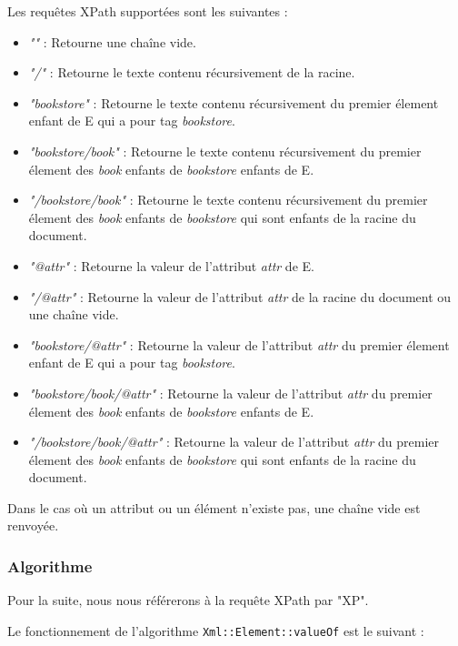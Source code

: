     Les requêtes XPath supportées sont les suivantes :
    \begin{itemize}
        \item \textit{""} : Retourne une chaîne vide.
        \item \textit{"/"} : Retourne le texte contenu récursivement de la racine.
        \item \textit{"bookstore"} : Retourne le texte contenu récursivement du premier élement enfant de E qui a pour tag \textit{bookstore}.
        \item \textit{"bookstore/book"} : Retourne le texte contenu récursivement du premier élement des \textit{book} enfants de \textit{bookstore} enfants de E.
        \item \textit{"/bookstore/book"} : Retourne le texte contenu récursivement du premier élement des \textit{book} enfants de \textit{bookstore} qui sont enfants de la racine du document.
        \item \textit{"@attr"} : Retourne la valeur de l'attribut \textit{attr} de E.
        \item \textit{"/@attr"} : Retourne la valeur de l'attribut \textit{attr} de la racine du document ou une chaîne vide.
        \item \textit{"bookstore/@attr"} : Retourne la valeur de l'attribut \textit{attr} du premier élement enfant de E qui a pour tag \textit{bookstore}.
        \item \textit{"bookstore/book/@attr"} : Retourne la valeur de l'attribut \textit{attr} du premier élement des \textit{book} enfants de \textit{bookstore} enfants de E.
        \item \textit{"/bookstore/book/@attr"} : Retourne la valeur de l'attribut \textit{attr} du premier élement des \textit{book} enfants de \textit{bookstore} qui sont enfants de la racine du document.
        \\
    \end{itemize}

    Dans le cas où un attribut ou un élément n'existe pas, une chaîne vide est renvoyée.

    \subsubsection{Algorithme}

    Pour la suite, nous nous référerons à la requête XPath par "XP".

    Le fonctionnement de l'algorithme \lstinline$Xml::Element::valueOf$ est le suivant :

